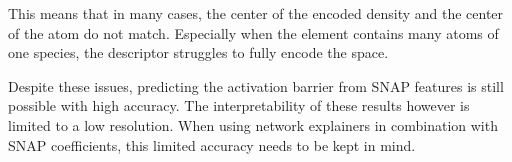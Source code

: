 This means that in many cases, the center of the encoded density and the center of the atom do not match.
Especially when the element contains many atoms of one species, the descriptor struggles to fully encode the space.

Despite these issues, predicting the activation barrier from SNAP features is still possible with high accuracy.
The interpretability of these results however is limited to a low resolution.
When using network explainers in combination with SNAP coefficients, this limited accuracy needs to be kept in mind.
